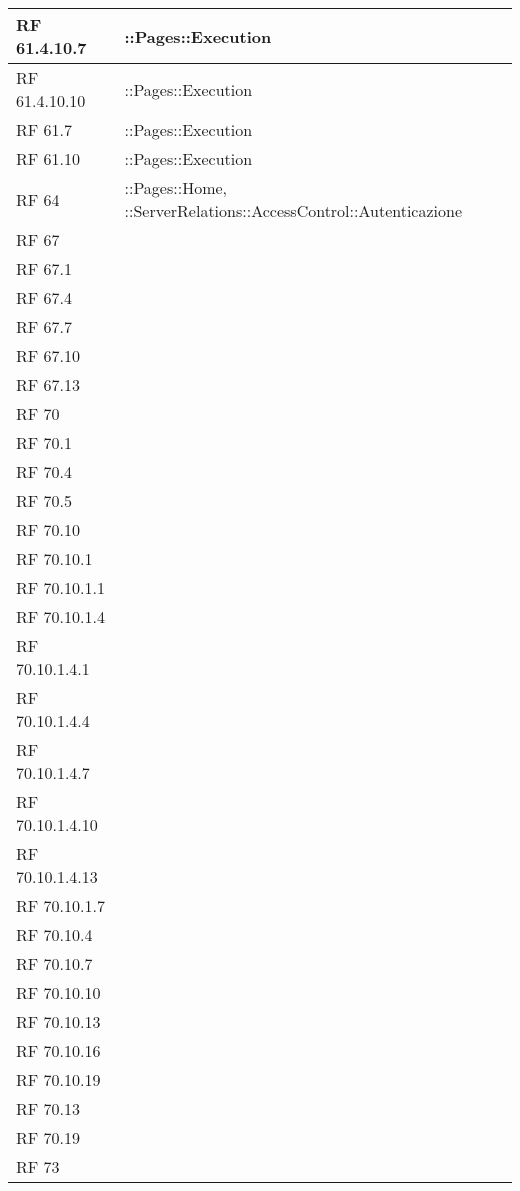 {\begin{longtable} [c]{| p{2cm} | p{13cm} |}
 \hline 
RF 61.4.10.7 & ::\-Pages::\-Execution\\ 
 \hline 
RF 61.4.10.10 & ::\-Pages::\-Execution\\ 
 \hline 
RF 61.7 & ::\-Pages::\-Execution\\ 
 \hline 
RF 61.10 & ::\-Pages::\-Execution\\ 
 \hline 
RF 64 & ::\-Pages::\-Home, ::\-ServerRelations::\-AccessControl::\-Autenticazione\\ 
 \hline 
RF 67 & \\ 
 \hline 
RF 67.1 & \\ 
 \hline 
RF 67.4 & \\ 
 \hline 
RF 67.7 & \\ 
 \hline 
RF 67.10 & \\ 
 \hline 
RF 67.13 & \\ 
 \hline 
RF 70 & \\ 
 \hline 
RF 70.1 & \\ 
 \hline 
RF 70.4 & \\ 
 \hline 
RF 70.5 & \\ 
 \hline 
RF 70.10 & \\ 
 \hline 
RF 70.10.1 & \\ 
 \hline 
RF 70.10.1.1 & \\ 
 \hline 
RF 70.10.1.4 & \\ 
 \hline 
RF 70.10.1.4.1 & \\ 
 \hline 
RF 70.10.1.4.4 & \\ 
 \hline 
RF 70.10.1.4.7 & \\ 
 \hline 
RF 70.10.1.4.10 & \\ 
 \hline 
RF 70.10.1.4.13 & \\ 
 \hline 
RF 70.10.1.7 & \\ 
 \hline 
RF 70.10.4 & \\ 
 \hline 
RF 70.10.7 & \\ 
 \hline 
RF 70.10.10 & \\ 
 \hline 
RF 70.10.13 & \\ 
 \hline 
RF 70.10.16 & \\ 
 \hline 
RF 70.10.19 & \\ 
 \hline 
RF 70.13 & \\ 
 \hline 
RF 70.19 & \\ 
 \hline 
RF 73 & \\ 
 \hline 
\end{longtable}}